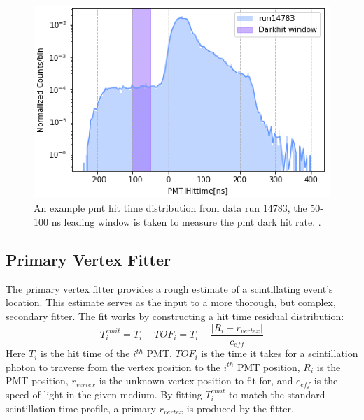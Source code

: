 \begin{figure}[htb]
	\centering
	\includegraphics[scale=0.4]{darkrate.png}
	\caption{An example pmt hit time distribution from data run 14783, the 50-100 ns leading window is taken to measure the pmt dark hit rate. \cite{li_phd}.}
	\label{fig:darkrate}
\end{figure}

\subsection{Primary Vertex Fitter}
The primary vertex fitter provides a rough estimate of a scintillating event's location. This estimate serves as the input to a more thorough, but complex, secondary fitter. The fit works by constructing a hit time residual distribution:
\begin{equation}
	T_{i}^{emit}=T_i-TOF_i = T_i - \frac{\left|R_i-r_{vertex}\right|}{c_{eff}}
	\label{eq:prim_vertex}
\end{equation}
Here $T_i$ is the hit time of the $i^{th}$ PMT, $TOF_i$ is the time it takes for a scintillation photon to traverse from the vertex position to the $i^{th}$ PMT position, $R_i$ is the PMT position, $r_{vertex}$ is the unknown vertex position to fit for, and $c_{eff}$ is the speed of light in the given medium. By fitting $T_i^{emit}$ to match the standard scintillation time profile, a primary $r_{vertex}$ is produced by the fitter.

